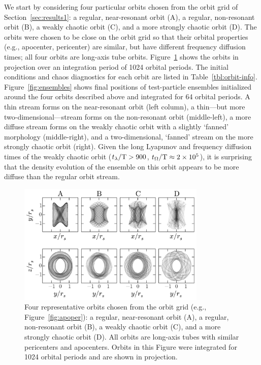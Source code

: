 We start by considering four particular orbits chosen from the orbit grid of Section~\ref{sec:results1}: a regular, near-resonant orbit (A), a regular, non-resonant orbit (B), a weakly chaotic orbit (C), and a more strongly chaotic orbit (D). The orbits were chosen to be close on the orbit grid so that their orbital properties (e.g., apocenter, pericenter) are similar, but have different frequency diffusion times; all four orbits are long-axis tube orbits. Figure~\ref{fig:orbits} shows the orbits in projection over an integration period of 1024 orbital periods. The initial conditions and chaos diagnostics for each orbit are listed in Table~\ref{tbl:orbit-info}. Figure~\ref{fig:ensembles} shows final positions of test-particle ensembles initialized around the four orbits described above and integrated for 64 orbital periods. A thin stream forms on the near-resonant orbit (left column), a thin---but more two-dimensional---stream forms on the non-resonant orbit (middle-left), a more diffuse stream forms on the weakly chaotic orbit with a slightly `fanned' morphology (middle-right), and a two-dimensional, `fanned' stream on the more strongly chaotic orbit (right). Given the long Lyapunov and frequency diffusion times of the weakly chaotic orbit ($t_\lambda/{\rm T} > 900$, $t_\Omega/{\rm T} \approx 2\times10^5$), it is surprising that the density evolution of the ensemble on this orbit appears to be more diffuse than the regular orbit stream. 

\begin{figure}[h]%
\begin{center}
\includegraphics[width=0.8\textwidth]{figures/ch3/four-orbits.pdf}
\caption{Four representative orbits chosen from the orbit grid (e.g., Figure~\ref{fig:apoper}): a regular, near-resonant orbit (A), a regular, non-resonant orbit (B), a weakly chaotic orbit (C), and a more strongly chaotic orbit (D). All orbits are long-axis tubes with similar pericenters and apocenters. Orbits in this Figure were integrated for 1024 orbital periods and are shown in projection.} 
\label{fig:orbits}
\end{center}
\end{figure}

